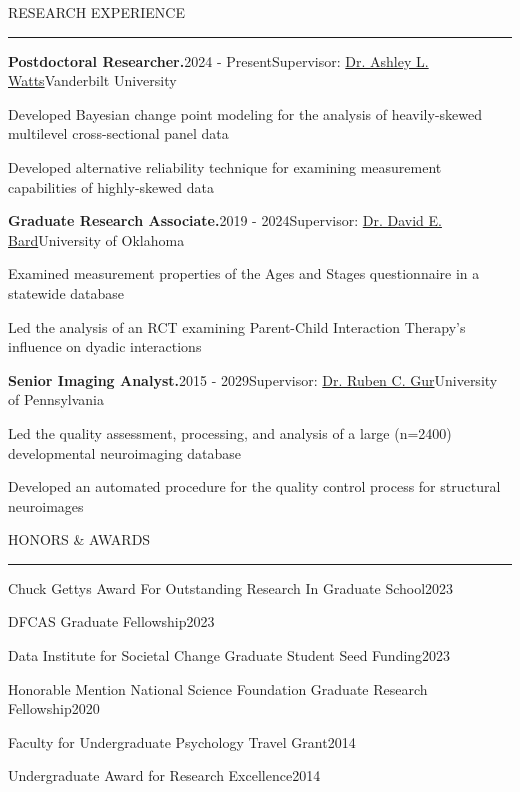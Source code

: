 \documentclass{resume} %
\renewenvironment{rSection}[1]{
\sectionskip
\textcolor{CarnegieMellonRed}{\MakeUppercase{#1}}
\sectionlineskip
\hrule
\begin{list}{}{
\setlength{\leftmargin}{1.5em}
}
\item[]
}{
\end{list}
}
\begin{document}
\begin{rSection}{Research Experience}
\begin{rSubsection}{\textbf{Postdoctoral Researcher.}}{2024 - Present}{Supervisor: \href{https://www.vanderbilt.edu/psychological_sciences/bio/ashley-watts}{Dr. Ashley L. Watts}}{Vanderbilt University}
\item Developed Bayesian change point modeling for the analysis of heavily-skewed multilevel cross-sectional panel data
\item Developed alternative reliability technique for examining measurement capabilities of highly-skewed data
\end{rSubsection}


\begin{rSubsection}{\textbf{Graduate Research Associate.}}{2019 - 2024}{Supervisor: \href{https://research.ouhsc.edu/about/administration/details/david-bard-phd}{Dr. David E. Bard}}{University of Oklahoma}
\item Examined measurement properties of the Ages and Stages questionnaire in a statewide database
\item Led the analysis of an RCT examining Parent-Child Interaction Therapy's influence on dyadic interactions  
\end{rSubsection}

\begin{rSubsection}{\textbf{Senior Imaging Analyst.}}{2015 - 2029}{Supervisor: \href{https://www.med.upenn.edu/bbl/faculty-rcgur.html}{Dr. Ruben C. Gur}}{University of Pennsylvania}
\item Led the quality assessment, processing, and analysis of a large (n=2400) developmental neuroimaging database
\item Developed an automated procedure for the quality control process for structural neuroimages 
\end{rSubsection}
    
\end{rSection}

\begin{rSection}{Honors \& Awards}
\begin{rSubsectionAward}{Chuck Gettys Award For Outstanding Research In Graduate School}{2023}\end{rSubsectionAward}
\begin{rSubsectionAward}{DFCAS Graduate Fellowship}{2023}\end{rSubsectionAward}
\begin{rSubsectionAward}{Data Institute for Societal Change Graduate Student Seed Funding}{2023}\end{rSubsectionAward}
\begin{rSubsectionAward}{Honorable Mention National Science Foundation Graduate Research Fellowship}{2020}\end{rSubsectionAward}
\begin{rSubsectionAward}{Faculty for Undergraduate Psychology Travel Grant}{2014}\end{rSubsectionAward}
\begin{rSubsectionAward}{Undergraduate Award for Research Excellence}{2014}\end{rSubsectionAward}
\end{rSection}
\newpage
\end{document}

